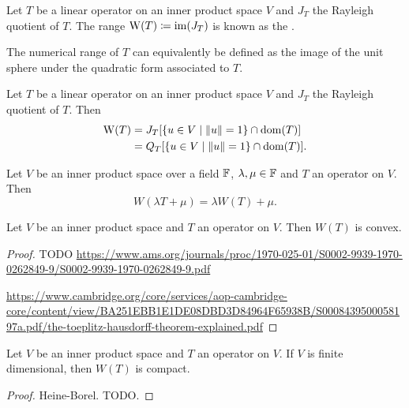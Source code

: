 \begin{definition}
Let $T$ be a linear operator on an inner product space $V$ and $J_T$ the Rayleigh quotient of $T$. The range $\operatorname{W}(T) \coloneqq \operatorname{im}(J_T)$ is known as the .
\end{definition}

The numerical range of $T$ can equivalently be defined as the image of the unit sphere under the quadratic form associated to $T$.

\begin{lemma}
Let $T$ be a linear operator on an inner product space $V$ and $J_T$ the Rayleigh quotient of $T$. Then
\begin{align*}
\NumRange(T) &= J_T[\setbuilder{u\in V}{\norm{u} = 1} \cap \dom(T)] \\
&= Q_T[\setbuilder{u\in V}{\norm{u} = 1}\cap \dom(T)].
\end{align*}
\end{lemma}

\begin{lemma}
Let $V$ be an inner product space over a field $\mathbb{F}$, $\lambda,\mu\in \mathbb{F}$ and $T$ an operator on $V$. Then
\[ W(\lambda T + \mu) = \lambda W(T) + \mu. \]
\end{lemma}

\begin{theorem}
Let $V$ be an inner product space and $T$ an operator on $V$. Then $W(T)$ is convex.
\end{theorem}
\begin{proof}
TODO \url{https://www.ams.org/journals/proc/1970-025-01/S0002-9939-1970-0262849-9/S0002-9939-1970-0262849-9.pdf}

\url{https://www.cambridge.org/core/services/aop-cambridge-core/content/view/BA251EBB1E1DE08DBD3D84964F65938B/S0008439500058197a.pdf/the-toeplitz-hausdorff-theorem-explained.pdf}
\end{proof}

\begin{proposition}
Let $V$ be an inner product space and $T$ an operator on $V$. If $V$ is finite dimensional, then $W(T)$ is compact.
\end{proposition}
\begin{proof}
Heine-Borel. TODO.
\end{proof}

